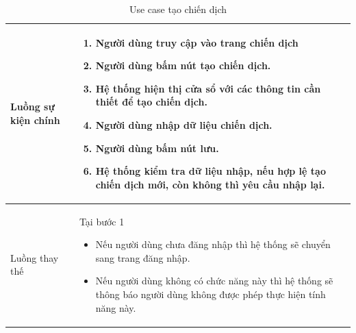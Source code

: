 \documentclass[12pt,a4paper]{article}
\begin{document}
\begin{table}[H]
\begin{tabular}{|p{3.5cm}|p{11.5cm}|c|}
            Luồng sự kiện chính & \vspace{-.8cm}\begin{enumerate}
                                                    \item Người dùng truy cập vào trang chiến dịch
                                                    \item  Người dùng bấm nút tạo chiến dịch.
                                                    \item  Hệ thống hiện thị cửa sổ với các thông tin cần thiết để tạo chiến dịch.
                                                    \item  Người dùng nhập dữ liệu chiến dịch.
                                                    \item Người dùng bấm nút lưu.
                                                    \item Hệ thống kiểm tra dữ liệu nhập, nếu hợp lệ tạo chiến dịch mới, còn không thì yêu cầu nhập lại.
            \end{enumerate}
            \\
            \hline
            Luồng thay thế & Tại bước 1\newline
            \vspace{-.8cm}\begin{itemize}
                              \item Nếu người dùng chưa đăng nhập thì hệ thống sẽ chuyển sang trang đăng nhập.
                              \item  Nếu người dùng không có chức năng này thì hệ thống sẽ thông báo người dùng không được phép thực hiện tính năng này.
            \end{itemize}
            \\
            \hline
        \end{tabular}
        \caption{Use case tạo chiến dịch}
    \end{table}


\end{document}
